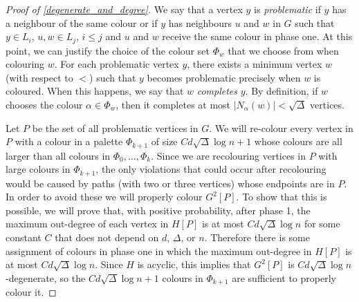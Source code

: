 \documentclass{patmorin}
\newcommand{\defin}[1]{\emph{\color{brightmaroon}#1}}
\begin{document}
\begin{proof}[Proof of \cref{degenerate_and_degree}]

  We say that a vertex $y$ is \defin{problematic} if $y$ has a neighbour of the same colour or if $y$ has neighbours $u$ and $w$ in $G$ such that $y\in L_i$, $u,w\in L_j$, $i \le j$ and $u$ and $w$ receive the same colour in phase one.  At this point, we can justify the choice of the colour set $\Phi_w$ that we choose from when colouring $w$. For each problematic vertex $y$, there exists a minimum vertex $w$ (with respect to $<$) such that $y$ becomes problematic precisely when $w$ is coloured.  When this happens, we say that $w$ \defin{completes} $y$. By definition, if $w$ chooses the colour $\alpha\in\Phi_w$, then it completes at most $|N_{\alpha}(w)|<\sqrt{\Delta}$ vertices.

  Let $P$ be the set of all problematic vertices in $G$.  We will re-colour every vertex in $P$ with a colour in a palette $\Phi_{k+1}$ of size $Cd\sqrt{\Delta}\log n+1$ whose colours are all larger than all colours in $\Phi_0,\ldots,\Phi_k$.  Since we are recolouring vertices in $P$ with large colours in $\Phi_{k+1}$, the only violations that could occur after recolouring would be caused by paths (with two or three vertices) whose endpoints are in $P$.  In order to avoid these we will properly colour $G^2[P]$.  To show that this is possible, we will prove that, with positive probability, after phase 1, the maximum out-degree of each vertex in $H[P]$ is at most $Cd\sqrt{\Delta}\log n$ for some constant $C$ that does not depend on $d$, $\Delta$, or $n$.  Therefore there is some assignment of colours in phase one in which the maximum out-degree in $H[P]$ is at most $Cd\sqrt{\Delta}\log n$.  Since $H$ is acyclic, this implies that $G^2[P]$ is $Cd\sqrt{\Delta}\log n$-degenerate, so the $Cd\sqrt{\Delta}\log n+1$ colours in $\Phi_{k+1}$ are sufficient to properly colour it.


\end{proof}
\end{document}
